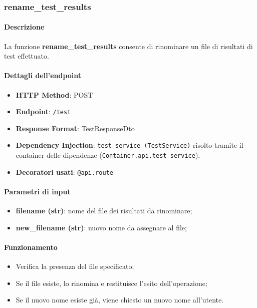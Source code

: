 \subsubsection{rename\_test\_results}
\label{subsubsec:renametestresults}

\paragraph{Descrizione}
La funzione \textbf{rename\_test\_results} consente di rinominare un file di risultati di test effettuato.

\paragraph{Dettagli dell'endpoint}
\begin{itemize}
    \item \textbf{HTTP Method}: POST
    \item \textbf{Endpoint}: \texttt{/test}
    \item \textbf{Response Format}: TestResponseDto
    \item \textbf{Dependency Injection}: \texttt{test\_service (TestService)} risolto tramite il container delle dipendenze (\texttt{Container.api.test\_service}).
    \item \textbf{Decoratori usati}: \texttt{@api.route}
\end{itemize}

\paragraph{Parametri di input}
\begin{itemize}
    \item \textbf{filename (str)}: nome del file dei risultati da rinominare;
    \item \textbf{new\_filename (str)}: nuovo nome da assegnare al file;
\end{itemize}

\paragraph{Funzionamento}
\begin{itemize}
    \item Verifica la presenza del file specificato;
    \item Se il file esiste, lo rinomina e restituisce l'esito dell'operazione;
    \item Se il nuovo nome esiste già, viene chiesto un nuovo nome all'utente.
\end{itemize}

